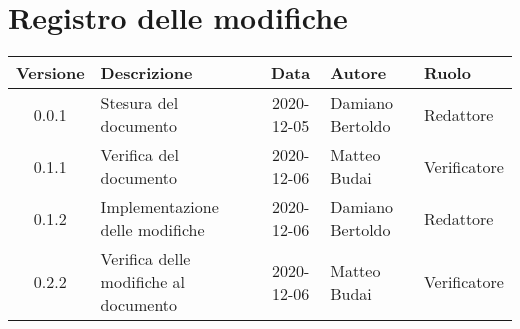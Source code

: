 \section*{Registro delle modifiche}

\begin{center}
	\begin{longtable}{|c|p{3.5cm}|c|p{3.1cm}|p{3cm}|}
	\hline
	\rowcolor{lighter-grayer}
	\textbf{Versione} & \textbf{Descrizione} & \textbf{Data} & \textbf{Autore} & \textbf{Ruolo} \\
	\hline
	\endfirsthead

	0.0.1 & Stesura del documento & 2020-12-05 & Damiano Bertoldo & Redattore \\
	\hline
	0.1.1 & Verifica del documento & 2020-12-06 & Matteo Budai & Verificatore \\
	\hline
	0.1.2 & Implementazione delle modifiche & 2020-12-06 & Damiano Bertoldo & Redattore \\
	\hline
	0.2.2 & Verifica delle modifiche al documento & 2020-12-06 & Matteo Budai & Verificatore \\
	\hline

	\end{longtable}
\end{center}
